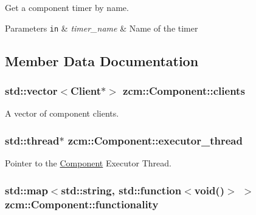 Get a component timer by name. 


\begin{DoxyParams}[1]{Parameters}
\mbox{\tt in}  & {\em timer\-\_\-name} & Name of the timer \\
\hline
\end{DoxyParams}


\subsection{Member Data Documentation}
\hypertarget{classzcm_1_1Component_a940e1b9755cd9f2bea95bda880999626}{
\subsubsection[{clients}]{\setlength{\rightskip}{0pt plus 5cm}std\-::vector$<${\bf Client}$\ast$$>$ zcm\-::\-Component\-::clients\hspace{0.3cm}{\ttfamily [protected]}}}\label{classzcm_1_1Component_a940e1b9755cd9f2bea95bda880999626}


A vector of component clients. 

\hypertarget{classzcm_1_1Component_a392ca3b6cd537cd7aa1d4db31dacdf4d}{
\subsubsection[{executor\-\_\-thread}]{\setlength{\rightskip}{0pt plus 5cm}std\-::thread$\ast$ zcm\-::\-Component\-::executor\-\_\-thread\hspace{0.3cm}{\ttfamily [protected]}}}\label{classzcm_1_1Component_a392ca3b6cd537cd7aa1d4db31dacdf4d}


Pointer to the \hyperlink{classzcm_1_1Component}{Component} Executor Thread. 

\hypertarget{classzcm_1_1Component_a1069ed1d42ae144d60537364450c54c8}{
\subsubsection[{functionality}]{\setlength{\rightskip}{0pt plus 5cm}std\-::map$<$std\-::string, std\-::function$<$void()$>$ $>$ zcm\-::\-Component\-::functionality}}\label{classzcm_1_1Component_a1069ed1d42ae144d60537364450c54c8}


